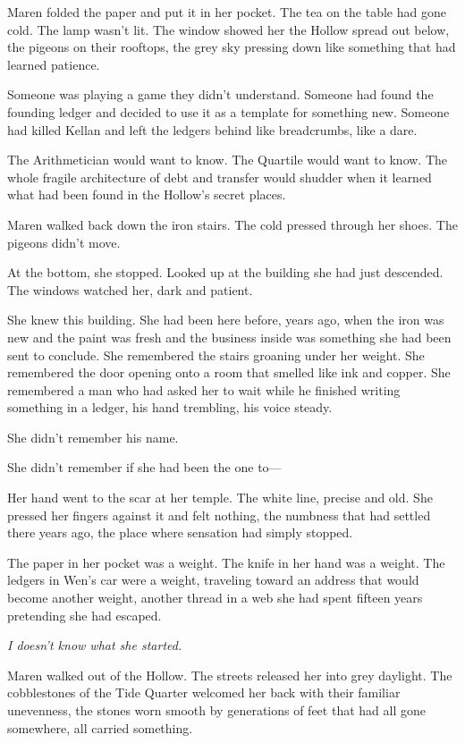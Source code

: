 \documentclass[12pt,letterpaper,openany]{book}
\begin{document}
\par
Maren folded the paper and put it in her pocket. The tea on the table had gone cold. The lamp wasn't lit. The window showed her the Hollow spread out below, the pigeons on their rooftops, the grey sky pressing down like something that had learned patience.
\par
Someone was playing a game they didn't understand. Someone had found the founding ledger and decided to use it as a template for something new. Someone had killed Kellan and left the ledgers behind like breadcrumbs, like a dare.
\par
The Arithmetician would want to know. The Quartile would want to know. The whole fragile architecture of debt and transfer would shudder when it learned what had been found in the Hollow's secret places.
\par
Maren walked back down the iron stairs. The cold pressed through her shoes. The pigeons didn't move.
\par
At the bottom, she stopped. Looked up at the building she had just descended. The windows watched her, dark and patient.
\par
She knew this building. She had been here before, years ago, when the iron was new and the paint was fresh and the business inside was something she had been sent to conclude. She remembered the stairs groaning under her weight. She remembered the door opening onto a room that smelled like ink and copper. She remembered a man who had asked her to wait while he finished writing something in a ledger, his hand trembling, his voice steady.
\par
She didn't remember his name.
\par
She didn't remember if she had been the one to—
\par
Her hand went to the scar at her temple. The white line, precise and old. She pressed her fingers against it and felt nothing, the numbness that had settled there years ago, the place where sensation had simply stopped.
\par
The paper in her pocket was a weight. The knife in her hand was a weight. The ledgers in Wen's car were a weight, traveling toward an address that would become another weight, another thread in a web she had spent fifteen years pretending she had escaped.
\par
\textit{I doesn't know what she started.}
\par
Maren walked out of the Hollow. The streets released her into grey daylight. The cobblestones of the Tide Quarter welcomed her back with their familiar unevenness, the stones worn smooth by generations of feet that had all gone somewhere, all carried something.
\end{document}
